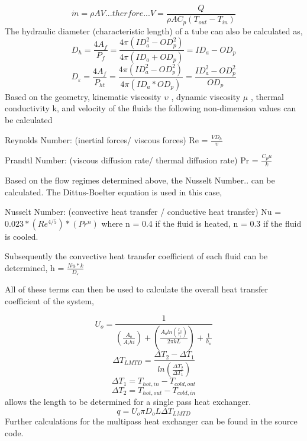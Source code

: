 \documentclass[heading.tex]{subfiles}
\begin{document}
\begin{equation*}
\dot{m} = \rho A V     ...therfore...        V  = \frac{Q} {\rho A C_{p} (T_{out} - T_{in})}
\end{equation*}
The hydraulic diameter (characteristic length) of a tube can also be calculated as,
\begin{equation*}
D_{h} = \frac{4 A_{f}} {P_{f}}  = \frac{4 \pi (ID_{a}^2-OD_{p}^2)} {4 \pi (ID_{a}+OD_{p})} = ID_{a}-OD_{p}
\end{equation*}
\begin{equation*}
D_{\varepsilon} = \frac{4 A_{f}} {P_{ht}}   =  \frac{4 \pi (ID_{a}^2-OD_{p}^2)} {4 \pi (ID_{a}*OD_{p})} = \frac{ID_{a}^2-OD_{p}^2}{OD_{p}}
\end{equation*}
Based on the geometry, kinematic viscosity  $\upsilon$ , dynamic viscosity  $\mu$ , thermal conductivity k, and velocity of the fluids the
following non-dimension values can be calculated

Reynolds Number: (inertial forces/ viscous forces)  Re = $\frac{V D_{h}} {\upsilon}$

Prandtl Number: (viscous diffusion rate/ thermal diffusion rate)  Pr = $\frac{C_{p} \mu} {k}$

Based on the flow regimes determined above, the Nusselt Number.. can be calculated. The Dittus-Boelter equation is used in this case,

Nusselt Number: (convective heat transfer / conductive heat transfer)  Nu = $0.023*(Re^{4/5})*(Pr^{n})$ where n = 0.4 if the fluid is heated, n = 0.3 if the fluid is cooled.

Subsequently the convective heat transfer coefficient of each fluid can be determined,  h = $\frac{Nu*k} {D_{\varepsilon}}$

All of these terms can then be used to calculate the overall heat transfer coefficient of the system,

\begin{equation*}
U_{o} = \frac{1} {(\frac{A_{o}}{A_{i}h{i}}) + (\frac{A_{o}ln(\frac{r_{o}}{r_{i}})}{2 \pi k L}) + \frac{1}{h_{o}}}
\end{equation*}
\begin{equation*}
\Delta {T}_{LMTD} = \frac{\Delta {T}_{2}-\Delta {T}_{1}}{ln(\frac{\Delta {T}_{2}}{\Delta {T}_{1}})}
\end{equation*}
\begin{equation*}
\Delta {T}_{1} = T_{hot,in} - T_{cold,out}
\end{equation*}
\begin{equation*}
\Delta {T}_{2} = T_{hot,out} - T_{cold,in}
\end{equation*}
allows the length to be determined for a single pass heat exchanger.
\begin{equation*}
q = U_{o} \pi D_{o} L \Delta {T}_{LMTD}
\end{equation*}
Further calculations for the multipass heat exchanger can be found in the source code.
\end{document}

